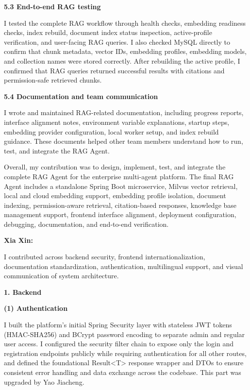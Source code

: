 \textbf{5.3 End-to-end RAG testing}

I tested the complete RAG workflow through health checks, embedding readiness checks, index rebuild, document index status inspection, active-profile verification, and user-facing RAG queries. I also checked MySQL directly to confirm that chunk metadata, vector IDs, embedding profiles, embedding models, and collection names were stored correctly. After rebuilding the active profile, I confirmed that RAG queries returned successful results with citations and permission-safe retrieved chunks.

\textbf{5.4 Documentation and team communication}

I wrote and maintained RAG-related documentation, including progress reports, interface alignment notes, environment variable explanations, startup steps, embedding provider configuration, local worker setup, and index rebuild guidance. These documents helped other team members understand how to run, test, and integrate the RAG Agent.

Overall, my contribution was to design, implement, test, and integrate the complete RAG Agent for the enterprise multi-agent platform. The final RAG Agent includes a standalone Spring Boot microservice, Milvus vector retrieval, local and cloud embedding support, embedding profile isolation, document indexing, permission-aware retrieval, citation-based responses, knowledge base management support, frontend interface alignment, deployment configuration, debugging, documentation, and end-to-end verification.

\vspace{4mm}

\noindent\textbf{Xia Xin:}

\vspace{2mm}

I contributed across backend security, frontend internationalization, documentation standardization, authentication, multilingual support, and visual communication of system architecture.

\textbf{1. Backend}

\textbf{(1) Authentication}

I built the platform's initial Spring Security layer with stateless JWT tokens (HMAC-SHA256) and BCrypt password encoding to separate admin and regular user access. I configured the security filter chain to expose only the login and registration endpoints publicly while requiring authentication for all other routes, and defined the foundational Result<T> response wrapper and DTOs to ensure consistent error handling and data exchange across the codebase. This part was upgraded by Yao Jiacheng.

